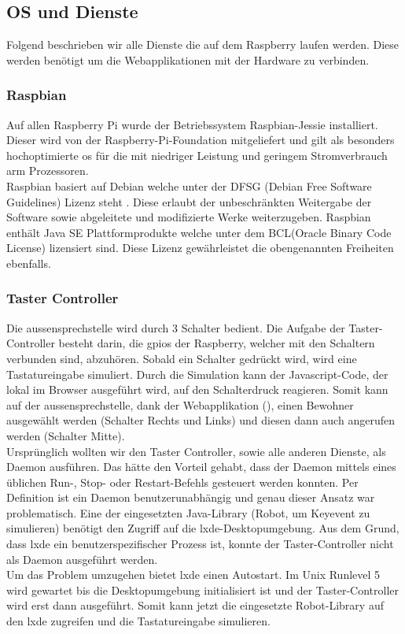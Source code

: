 \subsection{OS und Dienste}
\label{kap:dienste}
Folgend beschrieben wir alle Dienste die auf dem Raspberry laufen werden. Diese werden benötigt um die Webapplikationen mit der Hardware zu verbinden.

\subsubsection{Raspbian}
\label{kap:raspbian}
Auf allen Raspberry Pi wurde der Betriebssystem Raspbian-Jessie installiert. Dieser wird von der Raspberry-Pi-Foundation mitgeliefert und gilt als besonders hochoptimierte \gls{os} für die mit niedriger Leistung und geringem Stromverbrauch \gls{arm} Prozessoren.
\\
 Raspbian basiert auf Debian welche unter der DFSG (Debian Free Software Guidelines) Lizenz steht \cite{gesellschaftsvertrag}. Diese erlaubt der unbeschränkten Weitergabe der Software sowie abgeleitete und modifizierte Werke weiterzugeben. Raspbian enthält Java SE Plattformprodukte welche unter dem BCL(Oracle Binary Code License) lizensiert sind. Diese Lizenz gewährleistet die obengenannten Freiheiten ebenfalls.
 \\

\subsubsection{Taster Controller}
Die \gls{aussensprechstelle} wird durch 3 Schalter bedient. Die Aufgabe der Taster-Controller besteht darin, die \gls{gpio}s der Raspberry, welcher mit den Schaltern verbunden sind, abzuhören. Sobald ein Schalter gedrückt wird, wird eine Tastatureingabe simuliert. Durch die Simulation kann der Javascript-Code, der lokal im Browser ausgeführt wird, auf den Schalterdruck reagieren. Somit kann auf der \gls{aussensprechstelle}, dank der Webapplikation (), einen Bewohner ausgewählt werden (Schalter Rechts und Links) und diesen dann auch angerufen werden (Schalter Mitte).
\\
Ursprünglich wollten wir den Taster Controller, sowie alle anderen Dienste, als Daemon ausführen. Das hätte den Vorteil gehabt, dass der Daemon mittels eines üblichen Run-, Stop- oder Restart-Befehls gesteuert werden konnten. Per Definition ist ein Daemon benutzerunabhängig und genau dieser Ansatz war problematisch. Eine der eingesetzten Java-Library (Robot, um Keyevent zu simulieren) benötigt den Zugriff auf die \gls{lxde}-Desktopumgebung. Aus dem Grund, dass \gls{lxde} ein benutzerspezifischer Prozess ist, konnte der Taster-Controller nicht als Daemon ausgeführt werden.
\\
Um das Problem umzugehen bietet \gls{lxde} einen Autostart. Im Unix Runlevel 5 wird gewartet bis die Desktopumgebung initialisiert ist und der Taster-Controller wird erst dann ausgeführt. Somit kann jetzt die eingesetzte Robot-Library auf den \gls{lxde} zugreifen und die Tastatureingabe simulieren.
\\

